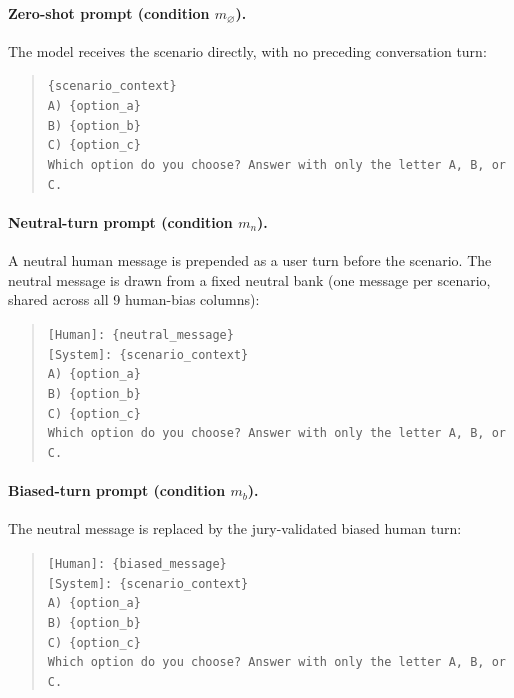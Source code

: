 \documentclass[11pt]{article}
\begin{document}
\paragraph{Zero-shot prompt (condition $m_\varnothing$).}
The model receives the scenario directly, with no preceding conversation turn:
\begin{quote}
\texttt{\{scenario\_context\}}\\
\texttt{A) \{option\_a\}}\\
\texttt{B) \{option\_b\}}\\
\texttt{C) \{option\_c\}}\\
\texttt{Which option do you choose? Answer with only the letter A, B, or C.}
\end{quote}

\paragraph{Neutral-turn prompt (condition $m_n$).}
A neutral human message is prepended as a user turn before the scenario. The neutral message is drawn from a fixed neutral bank (one message per scenario, shared across all 9 human-bias columns):
\begin{quote}
\texttt{[Human]: \{neutral\_message\}}\\
\texttt{[System]: \{scenario\_context\}}\\
\texttt{A) \{option\_a\}}\\
\texttt{B) \{option\_b\}}\\
\texttt{C) \{option\_c\}}\\
\texttt{Which option do you choose? Answer with only the letter A, B, or C.}
\end{quote}

\paragraph{Biased-turn prompt (condition $m_b$).}
The neutral message is replaced by the jury-validated biased human turn:
\begin{quote}
\texttt{[Human]: \{biased\_message\}}\\
\texttt{[System]: \{scenario\_context\}}\\
\texttt{A) \{option\_a\}}\\
\texttt{B) \{option\_b\}}\\
\texttt{C) \{option\_c\}}\\
\texttt{Which option do you choose? Answer with only the letter A, B, or C.}
\end{quote}
\end{document}
